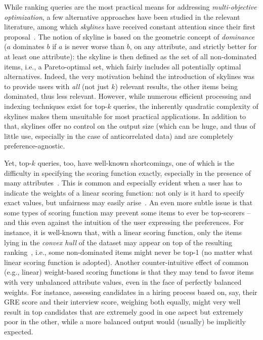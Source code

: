 While ranking queries are the most practical means for addressing \emph{multi-objective optimization},
a few alternative approaches have been studied in the relevant literature, among which \emph{skylines} have received constant attention since their first proposal~\cite{DBLP:conf/icde/BorzsonyiKS01}. The notion of skyline is based on the geometric concept of \emph{dominance} ($a$ dominates $b$ if $a$ is never worse than $b$, on any attribute, and strictly better for at least one attribute): the skyline is then defined as the set of all non-dominated items, i.e., a Pareto-optimal set, which fairly includes all potentially optimal alternatives.
Indeed, the very motivation behind the introduction of skylines was to provide users with \emph{all} (not just $k$) relevant results, the other items being dominated, thus less relevant.
%
However, while numerous efficient processing and indexing techniques exist for top-$k$ queries, the inherently quadratic complexity of skylines makes them unsuitable for most practical applications.
In addition to that, skylines offer no control on the output size (which can be huge, and thus of little use, especially in the case of anticorrelated data) and are completely preference-agnostic.

Yet, top-$k$ queries, too, have well-known shortcomings, one of which is the difficulty in
specifying the scoring function exactly, especially in the presence of many attributes~\cite{DBLP:journals/tods/CiacciaM20,DBLP:conf/sigmod/MouratidisL021,DBLP:journals/pvldb/NanongkaiSLLX10}. This is common and especially evident when a user has to indicate the weights of a linear scoring function: not only is it hard to specify exact values, but unfairness may easily arise~\cite{asudeh2018obtaining}.
%
An even more subtle issue is that some types of scoring function may prevent some items to ever be top-scorers -- and this even against the intuition of the user expressing the preferences. For instance, it is well-known that, with a linear scoring function, only the items lying in the \emph{convex hull} of the dataset may appear on top of the resulting ranking~\cite{DBLP:conf/sigmod/ChangBCLLS00}, i.e., 
some non-dominated items might never be top-1 (no matter what linear scoring function is adopted).
%
Another counter-intuitive effect of common (e.g., linear) weight-based scoring functions is that they may tend to favor items with very unbalanced attribute values, even in the face of perfectly balanced weights. For instance, assessing candidates in a hiring process based on, say, their GRE score and their interview score, weighing both equally, might very well result in top candidates that are extremely good in one aspect but extremely poor in the other, while a more balanced output would (usually) be implicitly expected.

